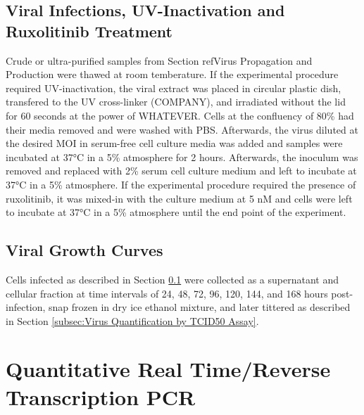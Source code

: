 \subsection{Viral Infections, UV-Inactivation and Ruxolitinib Treatment} \label{subsec:Viral Infections, UV-Inactivation and Ruxolitinib Treatment}
Crude or ultra-purified samples from Section ref{Virus Propagation and Production} were thawed at room temberature. If the experimental procedure required UV-inactivation, the viral extract was placed in circular plastic dish, transfered to the UV cross-linker (COMPANY), and irradiated without the lid for 60 seconds at the power of WHATEVER. Cells at the confluency of 80\% had their media removed and were washed with PBS. Afterwards, the virus diluted at the desired MOI in serum-free cell culture media was added and samples were incubated at 37°C in a 5\%  atmosphere for 2 hours. Afterwards, the inoculum was removed and replaced with 2\% serum cell culture medium and left to incubate at 37°C in a 5\%  atmosphere. If the experimental procedure required the presence of ruxolitinib, it was mixed-in with the culture medium at 5 nM and cells were left to incubate at 37°C in a 5\%  atmosphere until the end point of the experiment.




\subsection{Viral Growth Curves} \label{subsec:Viral Growth Curves}
Cells infected as described in Section \ref{subsec:Viral Infections, UV-Inactivation and Ruxolitinib Treatment} were collected as a supernatant and cellular fraction at time intervals of 24, 48, 72, 96, 120, 144, and 168 hours post-infection, snap frozen in dry ice ethanol mixture, and later tittered as described in Section \ref{subsec:Virus Quantification by TCID50 Assay}.




\section{Quantitative Real Time/Reverse Transcription PCR} \label{sec:Quantitative Real Time/Reverse Transcription PCR}
